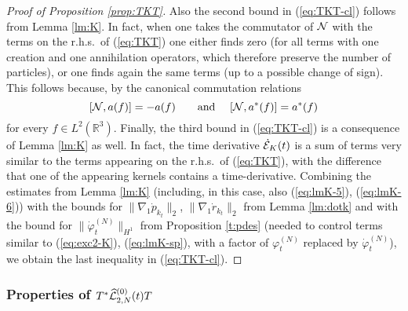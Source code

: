 \documentclass[11pt,a4paper]{article}
\newcommand{\ekt}{e^{K\lvert t\rvert}}	%
\newcommand{\bR}{{\mathbb R}}
\newcommand{\cE}{{\cal E}}
\newcommand{\cL}{{\cal L}}
\newcommand{\cN}{{\cal N}}
\newcommand{\norm}[1]{\lVert#1\rVert}	%
\newcommand{\ph}{\varphi_t^{(N)}}	%
\begin{document}
\begin{proof}[Proof of Proposition \ref{prop:TKT}]
Also the second bound in (\ref{eq:TKT-cl}) follows from Lemma \ref{lm:K}. In fact, when one takes the commutator of $\cN$ with the terms on the r.h.s.\ of (\ref{eq:TKT}) one either finds zero (for all terms with one creation and one annihilation operators, which therefore preserve the number of particles), or one finds again the same terms (up to a possible change of sign). This follows because, by the canonical commutation relations
\[ [ \cN , a (f) ] = - a (f) \qquad \text{and } \quad [\cN , a^* (f)] = a^* (f) \]
for every $f \in L^2 (\bR^3)$. Finally, the third bound in (\ref{eq:TKT-cl}) is a consequence of Lemma \ref{lm:K} as well. In fact, the time derivative $\dot{\cE}_K (t)$ is a sum of terms very similar to the terms appearing on the r.h.s.\ of (\ref{eq:TKT}), with the difference that one of the appearing kernels contains a time-derivative. Combining the estimates from Lemma \ref{lm:K} (including, in this case, also (\ref{eq:lmK-5}), (\ref{eq:lmK-6})) with the bounds for $\| \nabla_1 \dot{p}_{k_t} \|_2$, $\| \nabla_1 \dot{r}_{k_t} \|_2$ from Lemma \ref{lm:dotk} and with the bound for $\| \dot{\varphi}_t^{(N)} \|_{H^1}$ from  Proposition \ref{t:pdes} (needed to control terms similar to (\ref{eq:exc2-K}), (\ref{eq:lmK-sp}), with 
a factor of $\varphi^{(N)}_t$ replaced by $\dot{\varphi}^{(N)}_t$), we obtain the last inequality in (\ref{eq:TKT-cl}). 
\end{proof}

\subsubsection{Properties of $T^* \widehat{\cL}_{2,N}^{(0)} (t) T$}
\end{document}
